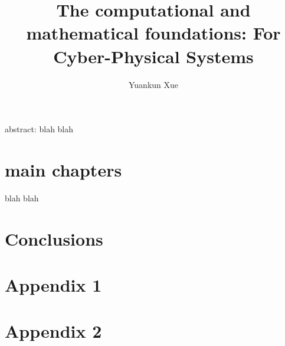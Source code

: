 \documentclass{USC-proposal}
\title{The computational and mathematical foundations:  \break
 For Cyber-Physical Systems}
\author{Yuankun Xue}
\numberwithin{equation}{chapter}
\begin{document}

\maketitle




\tableofcontents  %
\listoftables     %
\listoffigures    %

abstract: blah blah


\mainmatter


\chapter{main chapters}
blah blah
\chapter{Conclusions}




\appendix
\chapter{Appendix 1}
\chapter{Appendix 2}
\end{document}
